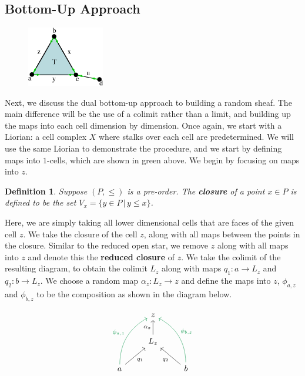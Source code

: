 \documentclass{article}
\newtheorem{definition}{Definition}
\theoremstyle{definition}
\begin{document}
\subsection{Bottom-Up Approach}
\begin{figure}[!htbp]
\centering
	\includegraphics[width=0.3\textwidth]{images/triangle_step3.eps}
\end{figure}

Next, we discuss the dual bottom-up approach to building a random sheaf. The main difference will be the use of a colimit rather than a limit, and building up the maps into each cell dimension by dimension. Once again, we start with a Liorian: a cell complex $X$ where stalks over each cell are predetermined. We will use the same Liorian to demonstrate the procedure, and we start by defining maps into $1$-cells, which are shown in green above. We begin by focusing on maps into $z$.

\begin{definition}
Suppose $(P, \leq)$ is a pre-order. The \textbf{closure} of a point $x \in P$ is defined to be the set $V_x = \{y \in P \, | \, y \leq x\}$.
\end{definition}

Here, we are simply taking all lower dimensional cells that are faces of the given cell $z$. We take the closure of the cell $z$, along with all maps between the points in the closure. Similar to the reduced open star, we remove $z$ along with all maps into $z$ and denote this the \textbf{reduced closure} of $z$. We take the colimit of the resulting diagram, to obtain the colimit $L_z$ along with maps $q_1: a  \rightarrow L_z$ and $q_2: b\rightarrow L_z$. We choose a random map $\alpha_z: L_z \rightarrow z$ and define the maps into $z$, $\phi_{a,z}$ and $\phi_{b,z}$ to be the composition as shown in the diagram below.

\[
\begin{tikzcd}
	& z & \\
	& L_z \arrow{u}{\alpha_z} & \\
	a \arrow[swap]{ur}{q_1} \arrow[bend left, ForestGreen]{uur}{\phi_{a,z}} & & b \arrow{ul}{q_2} \arrow[swap, bend right, ForestGreen]{uul}{\phi_{b,z}}
\end{tikzcd}
\]
\end{document}

